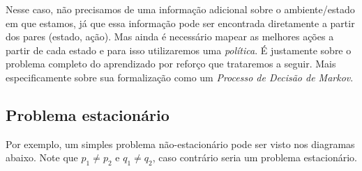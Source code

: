 \documentclass{article}
\begin{document}
            \begin{center}
                \fullrldiagram
            \end{center}
            
            Nesse caso, não precisamos de uma informação adicional sobre o ambiente/estado em que estamos, já que essa informação pode ser encontrada diretamente a partir dos pares (estado, ação). Mas ainda é necessário mapear as melhores ações a partir de cada estado e para isso utilizaremos uma \emph{política}. É justamente sobre o problema completo do aprendizado por reforço que trataremos a seguir. Mais especificamente sobre sua formalização como um \emph{Processo de Decisão de Markov}.
            
        \subsection{Problema estacionário}
    
            Por exemplo, um simples problema não-estacionário pode ser visto nos diagramas abaixo. Note que $p_1 \neq p_2$ e $q_1 \neq q_2$, caso contrário seria um problema estacionário. 
    
\end{document}
